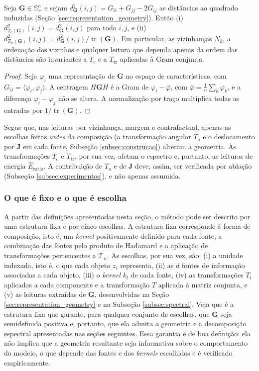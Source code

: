 \begin{proposition}\label{prop:invariancia_distancias}
Seja $\mathbf{G}\in\mathbb{S}_+^n$ e sejam $d_{\mathbf{G}}^2(i,j)=G_{ii}+G_{jj}-2G_{ij}$ as distâncias ao quadrado induzidas (Seção \ref{sec:representation_geometry}). Então \textnormal{(i)} $d^2_{T_c(\mathbf{G})}(i,j)=d^2_{\mathbf{G}}(i,j)$ para todo $i,j$, e \textnormal{(ii)} $d^2_{T_{\mathrm{tr}}(\mathbf{G})}(i,j)=d^2_{\mathbf{G}}(i,j)/\operatorname{tr}(\mathbf{G})$. Em particular, as vizinhanças $N_k$, a ordenação dos vizinhos e qualquer leitura que dependa apenas da ordem das distâncias são invariantes a $T_c$ e a $T_{\mathrm{tr}}$ aplicadas à Gram conjunta.
\end{proposition}
\begin{proof}
Seja $\varphi_i$ uma representação de $\mathbf{G}$ no espaço de características, com $G_{ij}=\langle\varphi_i,\varphi_j\rangle$. A centragem $H\mathbf{G}H$ é a Gram de $\varphi_i-\bar\varphi$, com $\bar\varphi=\frac1n\sum_k\varphi_k$, e a diferença $\varphi_i-\varphi_j$ não se altera. A normalização por traço multiplica todas as entradas por $1/\operatorname{tr}(\mathbf{G})$.
\end{proof}
Segue que, nas leituras por vizinhança, margem e contrafactual, apenas as escolhas feitas \emph{antes} da composição (a transformação angular $T_a$ e o deslocamento por $\mathbf{J}$ em cada fonte, Subseção \ref{subsec:construcao}) alteram a geometria. As transformações $T_c$ e $T_{\mathrm{tr}}$, por sua vez, afetam o espectro e, portanto, as leituras de energia $\widehat{E}_{\mathrm{ratio}}$. A contribuição de $T_a$ e de $\mathbf{J}$ deve, assim, ser verificada por ablação (Subseção \ref{subsec:experimentos}), e não apenas assumida.

\subsubsection*{O que é fixo e o que é escolha}

A partir das definições apresentadas nesta seção, o método pode ser descrito por uma estrutura fixa e por cinco escolhas. A estrutura fixa corresponde à forma de composição, isto é, um \textit{kernel} positivamente definido para cada fonte, a combinação das fontes pelo produto de Hadamard e a aplicação de transformações pertencentes a $\mathcal{T}_n$. As escolhas, por sua vez, são: (i) a unidade indexada, isto é, o que cada objeto $z_i$ representa, (ii) as $d$ fontes de informação associadas a cada objeto, (iii) o \textit{kernel} $k_l$ de cada fonte, (iv) as transformações $T_l$ aplicadas a cada componente e a transformação $T$ aplicada à matriz conjunta, e (v) as leituras extraídas de $\mathbf{G}$, desenvolvidas na Seção \ref{sec:representation_geometry} e na Subseção \ref{subsec:spectral}. Veja que é a estrutura fixa que garante, para qualquer conjunto de escolhas, que $\mathbf{G}$ seja semidefinida positiva e, portanto, que ela admita a geometria e a decomposição espectral apresentadas nas seções seguintes. Essa garantia é de boa definição: ela não implica que a geometria resultante seja informativa sobre o comportamento do modelo, o que depende das fontes e dos \textit{kernels} escolhidos e é verificado empiricamente.

